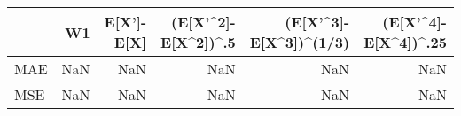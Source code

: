 \begin{tabular}{lrrrrr}
\toprule
{} &  W1 &  E[X']-E[X] &  (E[X'\textasciicircum 2]-E[X\textasciicircum 2])\textasciicircum .5 &  (E[X'\textasciicircum 3]-E[X\textasciicircum 3])\textasciicircum (1/3) &  (E[X'\textasciicircum 4]-E[X\textasciicircum 4])\textasciicircum .25 \\
\midrule
MAE & NaN &         NaN &                  NaN &                     NaN &                   NaN \\
MSE & NaN &         NaN &                  NaN &                     NaN &                   NaN \\
\bottomrule
\end{tabular}
